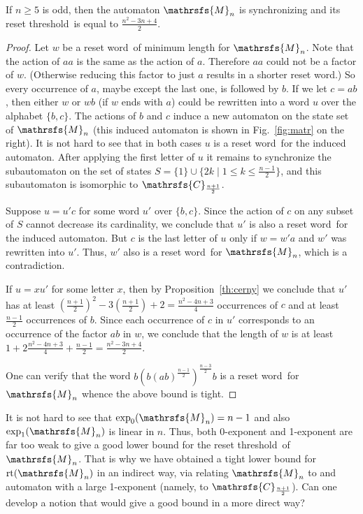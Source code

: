\documentclass[11pt]{llncs}
\newcommand{\sw}{reset word}
\newcommand{\reth}{reset threshold}
\DeclareMathOperator{\rt}{rt}
\begin{document}
\begin{theorem}
\label{th:matr} If $n \geq 5$ is odd, then the automaton $\mathrsfs{M}_n$ is
synchronizing and its \reth\ is equal to $\frac{n^2 -3n + 4}{2}$.
\end{theorem}

\begin{proof}
Let $w$ be a \sw\ of minimum length for $\mathrsfs{M}_n$. Note that the action
of $aa$ is the same as the action of $a$. Therefore $aa$ could not be a factor
of $w$. (Otherwise reducing this factor to just $a$ results in a shorter \sw.)
So every occurrence of $a$, maybe except the last one, is followed by $b$. If
we let $c = ab$, then either $w$ or $wb$ (if $w$ ends with $a$) could be
rewritten into a word $u$ over the alphabet $\{b,c\}$. The actions of $b$ and
$c$ induce a new automaton on the state set of $\mathrsfs{M}_n$ (this induced
automaton is shown in Fig.~\ref{fig:matr} on the right). It is not hard to see
that in both cases $u$ is a \sw\ for the induced automaton. After applying the
first letter of $u$ it remains to synchronize the subautomaton on the set of
states $S =\{1\} \cup \{2k \mid 1 \leq k \leq \frac{n - 1}{2}\}$, and this
subautomaton is isomorphic to $\mathrsfs{C}_{\frac{n + 1}{2}}$.

Suppose $u = u'c$ for some word $u'$ over $\{b,c\}$. Since the action of $c$ on
any subset of $S$ cannot decrease its cardinality, we conclude that $u'$ is
also a \sw\ for the induced automaton. But $c$ is the last letter of $u$ only
if $w = w'a$ and $w'$ was rewritten into $u'$. Thus, $w'$ also is a \sw\ for
$\mathrsfs{M}_n$, which is a contradiction.

If $u = xu'$ for some letter $x$, then by Proposition~\ref{th:cerny} we
conclude that $u'$ has at least $(\frac{n + 1}{2})^2 - 3(\frac{n + 1}{2}) + 2 =
\frac{n^2 - 4n + 3}{4}$ occurrences of $c$ and at least $\frac{n - 1}{2}$
occurrences of $b$. Since each occurrence of $c$ in $u'$ corresponds to an
occurrence of the factor $ab$ in $w$, we conclude that the length of $w$ is at
least $1 + 2\frac{n^2 - 4n + 3}{4} + \frac{n - 1}{2} = \frac{n^2 - 3n + 4}{2}$.

One can verify that the word $b(b(ab)^{\frac{n - 1}{2}})^{\frac{n - 3}{2}}b$ is
a \sw\ for $\mathrsfs{M}_n$ whence the above bound is tight.
\end{proof}

It is not hard to see that $\exp_0(\mathrsfs{M}_n)=n-1$ and also
$\exp_1(\mathrsfs{M}_n)$ is linear in $n$. Thus, both 0-exponent and 1-exponent
are far too weak to give a good lower bound for the \reth\ of $\mathrsfs{M}_n$.
That is why we have obtained a tight lower bound for $\rt(\mathrsfs{M}_n)$ in an
indirect way, via relating $\mathrsfs{M}_n$ to and automaton with a large
1-exponent (namely, to $\mathrsfs{C}_{\frac{n + 1}{2}}$). Can one develop a
notion that would give a good bound in a more direct way?
\end{document}
